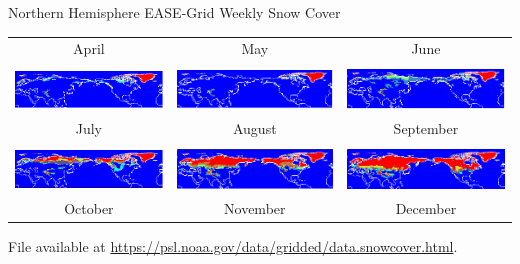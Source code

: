 \documentclass[compress,11pt,xcolor=svgnames,aspectratio=169]{beamer}
\begin{document}
\begin{frame}[fragile]{Northern Hemisphere EASE-Grid Weekly Snow Cover}
\begin{center}
{\begin{tabular}{ccc}
April & May & June \\ & & \\
\includegraphics[scale=0.35]{fig/snow6} &
\includegraphics[scale=0.35]{fig/snow5} &
\includegraphics[scale=0.35]{fig/snow4} \\
July & August & September \\ & & \\
\includegraphics[scale=0.35]{fig/snow3} &
\includegraphics[scale=0.35]{fig/snow2} &
\includegraphics[scale=0.35]{fig/snow1} \\
October & November & December
\end{tabular}
}
\end{center}

{\tiny File available at \url{https://psl.noaa.gov/data/gridded/data.snowcover.html}}.

\end{frame}
\end{document}
